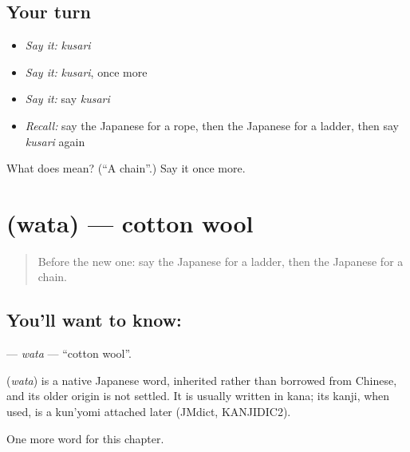 \subsection*{Your turn}
\begin{itemize}
\raggedright
  \item \emph{Say it:} \emph{kusari}
  \item \emph{Say it:} \emph{kusari}, once more
  \item \emph{Say it:} say \emph{kusari}
  \item \emph{Recall:} say the Japanese for a rope, then the Japanese for a ladder, then say \emph{kusari} again
\end{itemize}

\begin{tcolorbox}[breakable,colback=teal!4,colframe=teal!35!black,title={Before you move on}]
What does  mean? (\textquotedblleft{}A chain\textquotedblright{}.) Say it once more.
\end{tcolorbox}
\section[\texorpdfstring{\ja{わた} (wata)}{わた (wata)}]{ (wata) — cotton wool}

\label{lesson:JA-C118-wata}



\begin{quote}
Before the new one: say the Japanese for a ladder, then the Japanese for a chain.
\end{quote}

\subsection*{You'll want to know: }
\textbf{} — \emph{wata} — \textquotedblleft{}cotton wool\textquotedblright{}.

\begin{cousinweb}
\textbf{} (\emph{wata}) is a native Japanese word, inherited rather than borrowed from Chinese, and its older origin is not settled. It is usually written in kana; its kanji, when used, is a kun'yomi attached later (JMdict, KANJIDIC2).
\end{cousinweb}

\begin{grammarlens}[title={What you've built}]
One more word for this chapter.
\end{grammarlens}

